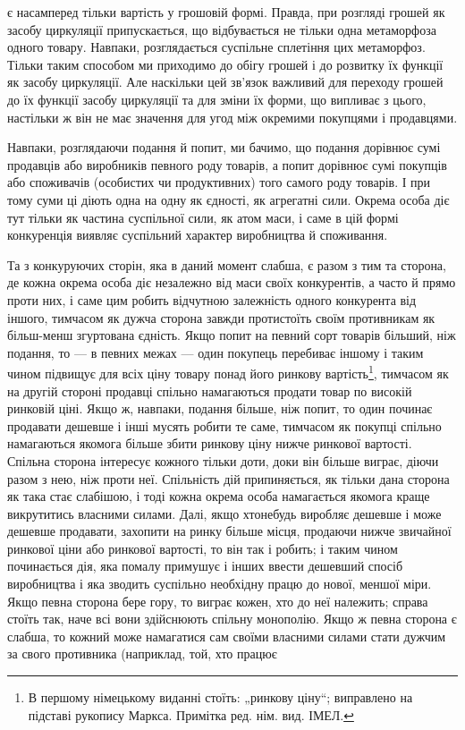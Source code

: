 \parcont{}  %
є насамперед тільки вартість у грошовій формі. Правда, при
розгляді грошей як засобу циркуляції припускається, що відбувається
не тільки одна метаморфоза одного товару. Навпаки,
розглядається суспільне сплетіння цих метаморфоз. Тільки
таким способом ми приходимо до обігу грошей і до розвитку їх
функції як засобу циркуляції. Але наскільки цей зв’язок важливий
для переходу грошей до їх функції засобу циркуляції та
для зміни їх форми, що випливає з цього, настільки ж він не
має значення для угод між окремими покупцями і продавцями.

Навпаки, розглядаючи подання й попит, ми бачимо, що подання
дорівнює сумі продавців або виробників певного роду
товарів, а попит дорівнює сумі покупців або споживачів (особистих
чи продуктивних) того самого роду товарів. І при тому
суми ці діють одна на одну як єдності, як агрегатні сили. Окрема
особа діє тут тільки як частина суспільної сили, як атом маси,
і саме в цій формі конкуренція виявляє суспільний характер
виробництва й споживання.

Та з конкуруючих сторін, яка в даний момент слабша, є разом
з тим та сторона, де кожна окрема особа діє незалежно від маси
своїх конкурентів, а часто й прямо проти них, і саме цим робить
відчутною залежність одного конкурента від іншого, тимчасом
як дужча сторона завжди протистоїть своїм противникам як
більш-менш згуртована єдність. Якщо попит на певний сорт
товарів більший, ніж подання, то — в певних межах — один покупець
перебиває іншому і таким чином підвищує для всіх ціну
товару понад його ринкову вартість\footnote*{
В першому німецькому виданні стоїть: „ринкову ціну“; виправлено на
підставі рукопису Маркса. Примітка ред. нім. вид. ІМЕЛ.
}, тимчасом як на другій
стороні продавці спільно намагаються продати товар по високій
ринковій ціні. Якщо ж, навпаки, подання більше, ніж попит,
то один починає продавати дешевше і інші мусять робити те саме,
тимчасом як покупці спільно намагаються якомога більше збити
ринкову ціну нижче ринкової вартості. Спільна сторона інтересує
кожного тільки доти, доки він більше виграє, діючи разом з нею,
ніж проти неї. Спільність дій припиняється, як тільки дана сторона
як така стає слабішою, і тоді кожна окрема особа намагається
якомога краще викрутитись власними силами. Далі,
якщо хтонебудь виробляє дешевше і може дешевше продавати,
захопити на ринку більше місця, продаючи нижче звичайної
ринкової ціни або ринкової вартості, то він так і робить; і таким
чином починається дія, яка помалу примушує і інших ввести
дешевший спосіб виробництва і яка зводить суспільно необхідну
працю до нової, меншої міри. Якщо певна сторона бере гору,
то виграє кожен, хто до неї належить; справа стоїть так, наче
всі вони здійснюють спільну монополію. Якщо ж певна сторона
є слабша, то кожний може намагатися сам своїми власними силами
стати дужчим за свого противника (наприклад, той, хто працює
\parbreak{}  %
